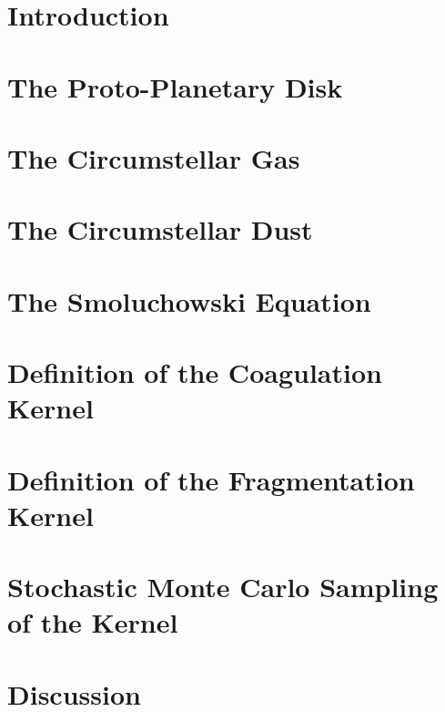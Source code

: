 \chapter{Introduction}
    \label{ch:introduction}
    
\chapter{The Proto-Planetary Disk}
    \label{ch:disk}
    
\chapter{The Circumstellar Gas}
    \label{ch:gas}
    
\chapter{The Circumstellar Dust}
    \label{ch:dust}
    
\chapter{The Smoluchowski Equation}
    \label{ch:smoluchoswki}
    
\chapter{Definition of the Coagulation Kernel}
    \label{ch:coagulation}
    
\chapter{Definition of the Fragmentation Kernel}
    \label{ch:fragmentation}
    
\chapter{Stochastic Monte Carlo Sampling of the Kernel}
    \label{ch:sampling}
    
\chapter{Discussion}
    \label{ch:discussion}
    
